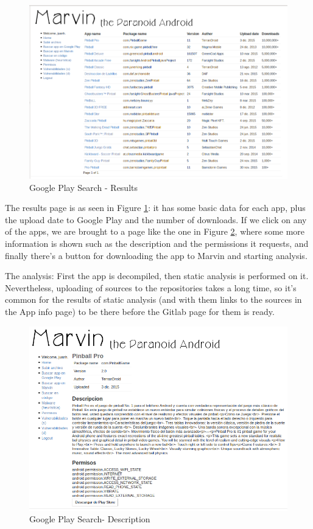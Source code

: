 \documentclass[11pt]{article}
\begin{document}
\begin{figure}[H]
\begin{center}
\includegraphics[width=.8\textwidth]{graphics/marvin_gplay2.png}
\caption{Google Play Search - Results} \label{gplay2}
\end{center}
\end{figure}
The results page is as seen in Figure \ref{gplay2}: it has some basic data for each app, plus the upload date to Google Play and the number of downloads. If we click on any of the apps, we are brought to a page like the one in Figure \ref{gplay3}, where some more information is shown such as the description and the permissions it requests, and finally there's a button for downloading the app to Marvin and starting analysis.

The analysis: First the app is decompiled, then static analysis is performed on it. Nevertheless, uploading of sources to the repositories takes a long time, so it's common for the results of static analysis (and with them links to the sources in the App info page) to be there before the Gitlab page for them is ready.


\begin{figure}[H]
\begin{center}
\includegraphics[width=.8\textwidth]{graphics/marvin_gplay3.png}
\caption{Google Play Search- Description} \label{gplay3}
\end{center}
\end{figure}
\end{document}
